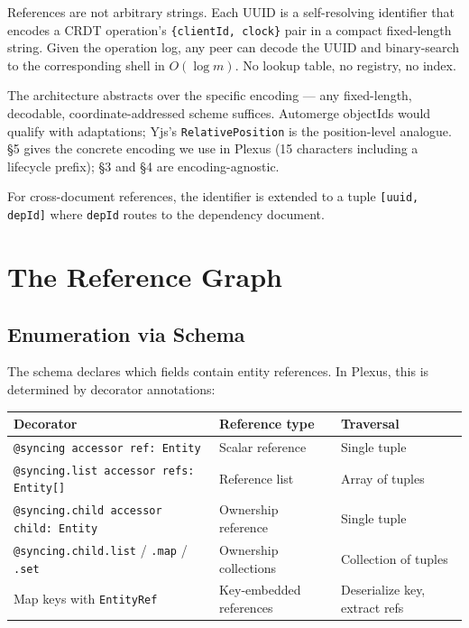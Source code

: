 References are not arbitrary strings. Each UUID is a self-resolving identifier that encodes a CRDT operation's \texttt{\{clientId, clock\}} pair in a compact fixed-length string. Given the operation log, any peer can decode the UUID and binary-search to the corresponding shell in $O(\log m)$. No lookup table, no registry, no index.

The architecture abstracts over the specific encoding --- any fixed-length, decodable, coordinate-addressed scheme suffices. Automerge objectIds would qualify with adaptations; Yjs's \texttt{RelativePosition} is the position-level analogue. \S5 gives the concrete encoding we use in Plexus (15 characters including a lifecycle prefix); \S3 and \S4 are encoding-agnostic.

For cross-document references, the identifier is extended to a tuple \texttt{[uuid, depId]} where \texttt{depId} routes to the dependency document.

\section{The Reference Graph}

\subsection{Enumeration via Schema}

The schema declares which fields contain entity references. In Plexus, this is determined by decorator annotations:

\begin{table}[ht]
\centering
\small
\begin{tabularx}{\textwidth}{@{}lXX@{}}
\toprule
\textbf{Decorator} & \textbf{Reference type} & \textbf{Traversal} \\
\midrule
\texttt{@syncing accessor ref: Entity} & Scalar reference & Single tuple \\
\texttt{@syncing.list accessor refs: Entity[]} & Reference list & Array of tuples \\
\texttt{@syncing.child accessor child: Entity} & Ownership reference & Single tuple \\
\texttt{@syncing.child.list} / \texttt{.map} / \texttt{.set} & Ownership collections & Collection of tuples \\
Map keys with \texttt{EntityRef}\cite{plexus:keys} & Key-embedded references & Deserialize key, extract refs \\
\bottomrule
\end{tabularx}
\end{table}

